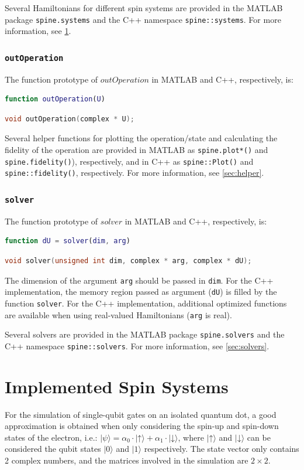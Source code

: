 \documentclass[10pt,a4paper,onecolumn,notitlepage]{article}
\begin{document}
Several Hamiltonians for different spin systems are provided in the MATLAB package \lstinline{spine.systems} and the C++ namespace \lstinline{spine::systems}. For more information, see \cref{sec:systems}.

\subsubsection{\lstinline{outOperation}}
The function prototype of $\mathit{outOperation}$ in MATLAB and C++, respectively, is:
\begin{lstlisting}[language=MATLAB]
function outOperation(U)
\end{lstlisting}
\begin{lstlisting}[language=C++]
void outOperation(complex * U);
\end{lstlisting}

Several helper functions for plotting the operation/state and calculating the fidelity of the operation are provided in MATLAB as \lstinline{spine.plot*()} and \lstinline{spine.fidelity()}), respectively, and in C++ as \lstinline{spine::Plot()} and \lstinline{spine::fidelity()}, respectively. For more information, see \cref{sec:helper}.

\subsubsection{\lstinline{solver}}
The function prototype of $\mathit{solver}$ in MATLAB and C++, respectively, is:
\begin{lstlisting}[language=MATLAB]
function dU = solver(dim, arg)
\end{lstlisting}
\begin{lstlisting}[language=C++]
void solver(unsigned int dim, complex * arg, complex * dU);
\end{lstlisting}
The dimension of the argument \lstinline{arg} should be passed in \lstinline{dim}.
For the C++ implementation, the memory region passed as argument (\lstinline{dU}) is filled by the function \lstinline{solver}. For the C++ implementation, additional optimized functions are available when using real-valued Hamiltonians (\lstinline{arg} is real).

Several solvers are provided in the MATLAB package \lstinline{spine.solvers} and the C++ namespace \lstinline{spine::solvers}. For more information, see \cref{sec:solvers}.

\section{Implemented Spin Systems}
\label{sec:systems}
For the simulation of single-qubit gates on an isolated quantum dot, a good approximation is obtained when only considering the spin-up and spin-down states of the electron, i.e.: $|\psi\rangle = \alpha_0 \cdot |\mathord{\uparrow}\rangle + \alpha_1 \cdot |\mathord{\downarrow}\rangle$, where $|\mathord{\uparrow}\rangle$ and $|\mathord{\downarrow}\rangle$ can be considered the qubit states $|\mathord{0}\rangle$ and $|\mathord{1}\rangle$ respectively. The state vector only contains 2 complex numbers, and the matrices involved in the simulation are $2 \times 2$.
\end{document}
